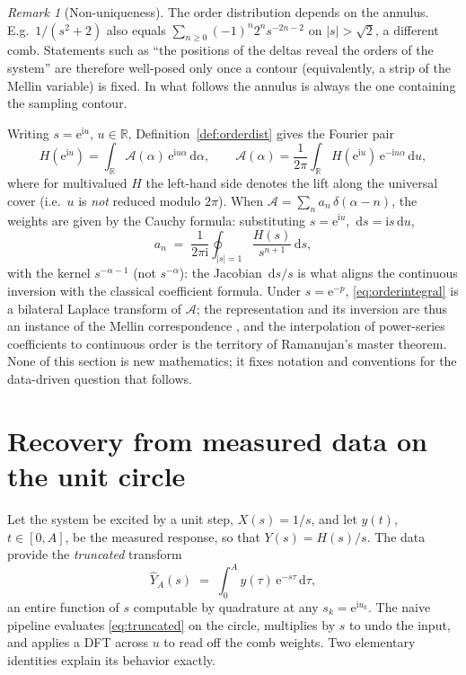 \documentclass[11pt, a4paper]{article}
\theoremstyle{definition}
\theoremstyle{remark}
\newtheorem{remark}[theorem]{Remark}
\newcommand{\R}{\mathbb{R}}
\newcommand{\dd}{\,\mathrm{d}}
\newcommand{\ii}{\mathrm{i}}
\newcommand{\ee}{\mathrm{e}}
\begin{document}
\begin{remark}[Non-uniqueness]\label{rem:annulus}
The order distribution depends on the annulus. E.g.\
$1/(s^{2}+2)$ also equals $\sum_{n\ge0}(-1)^{n}2^{n}s^{-2n-2}$ on
$|s|>\sqrt2$, a different comb. Statements such as ``the positions of the
deltas reveal the orders of the system'' are therefore well-posed only once
a contour (equivalently, a strip of the Mellin variable) is fixed. In what
follows the annulus is always the one containing the sampling contour.
\end{remark}

Writing $s=\ee^{\ii u}$, $u\in\R$, Definition~\ref{def:orderdist} gives the
Fourier pair
\begin{equation}\label{eq:fourierpair}
H(\ee^{\ii u})=\int_\R \mathcal{A}(\alpha) \, \ee^{\ii u\alpha} \dd\alpha ,
\qquad
\mathcal{A}(\alpha)=\frac{1}{2\pi}\int_{\R} H(\ee^{\ii u})\,
\ee^{-\ii u\alpha}\dd u ,
\end{equation}
where for multivalued $H$ the left-hand side denotes the lift along the
universal cover (i.e.\ $u$ is \emph{not} reduced modulo $2\pi$). When
$\mathcal{A}=\sum_n a_n\, \delta(\alpha-n)$, the weights are given by the
Cauchy formula: substituting $s=\ee^{\ii u}$, $\dd s=\ii s\dd u$,
\begin{equation}\label{eq:cauchy}
a_n\;=\; \frac{1}{2\pi\ii}
\oint_{|s|=1} \frac{H(s)}{s^{n+1}}\dd s ,
\end{equation}
with the kernel $s^{-\alpha-1}$ (not $s^{-\alpha}$): the Jacobian
$\dd s/s$ is what aligns the continuous inversion with the classical
coefficient formula. Under $s=\ee^{-p}$, \eqref{eq:orderintegral} is a
bilateral Laplace transform of $\mathcal{A}$; the representation and its
inversion are thus an instance of the Mellin correspondence
\cite{LuchkoKiryakova2013}, and the interpolation of power-series
coefficients to continuous order is the territory of Ramanujan's master
theorem. None of this section is new mathematics; it fixes notation and
conventions for the data-driven question that follows.

\section{Recovery from measured data on the unit circle}\label{sec:circle}

Let the system be excited by a unit step, $X(s)=1/s$, and let
$y(t)$, $t\in[0,A]$, be the measured response, so that
$Y(s)=H(s)/s$. The data provide the \emph{truncated} transform
\begin{equation}\label{eq:truncated}
\widehat{Y}_{\!A}(s)\;=\;\int_0^{A} y(\tau)\,\ee^{-s\tau}\dd\tau ,
\end{equation}
an entire function of $s$ computable by quadrature at any $s_k=\ee^{\ii u_k}$.
The naive pipeline evaluates \eqref{eq:truncated} on the circle, multiplies
by $s$ to undo the input, and applies a DFT across $u$ to read off the comb
weights. Two elementary identities explain its behavior exactly.
\end{document}
